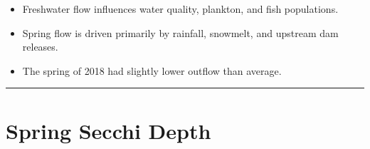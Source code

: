 \documentclass[
]{book}
\providecommand{\tightlist}{%
  \setlength{\itemsep}{0pt}\setlength{\parskip}{0pt}}
\begin{document}
\begin{itemize}
\tightlist
\item
  Freshwater flow influences water quality, plankton, and fish populations.
\item
  Spring flow is driven primarily by rainfall, snowmelt, and upstream dam releases.
\item
  The spring of 2018 had slightly lower outflow than average.
\end{itemize}

\begin{center}\rule{0.5\linewidth}{0.5pt}\end{center}

\hypertarget{spring-secchi-depth}{%
\section{Spring Secchi Depth}\label{spring-secchi-depth}}
\end{document}
